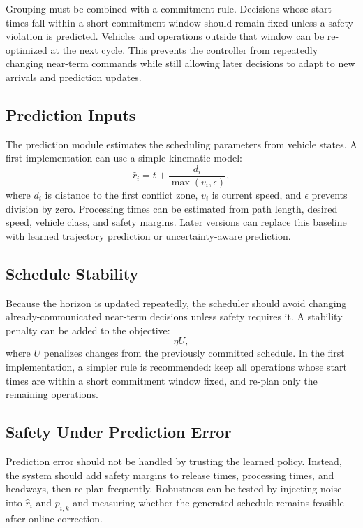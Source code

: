 Grouping must be combined with a commitment rule. Decisions whose start times fall within a short commitment window should remain fixed unless a safety violation is predicted. Vehicles and operations outside that window can be re-optimized at the next cycle. This prevents the controller from repeatedly changing near-term commands while still allowing later decisions to adapt to new arrivals and prediction updates.

\subsection{Prediction Inputs}

The prediction module estimates the scheduling parameters from vehicle states. A first implementation can use a simple kinematic model:
\begin{equation}
    \hat{r}_i = t + \frac{d_i}{\max(v_i,\epsilon)},
\end{equation}
where $d_i$ is distance to the first conflict zone, $v_i$ is current speed, and $\epsilon$ prevents division by zero. Processing times can be estimated from path length, desired speed, vehicle class, and safety margins. Later versions can replace this baseline with learned trajectory prediction or uncertainty-aware prediction.

\subsection{Schedule Stability}

Because the horizon is updated repeatedly, the scheduler should avoid changing already-communicated near-term decisions unless safety requires it. A stability penalty can be added to the objective:
\begin{equation}
    \eta U,
\end{equation}
where $U$ penalizes changes from the previously committed schedule. In the first implementation, a simpler rule is recommended: keep all operations whose start times are within a short commitment window fixed, and re-plan only the remaining operations.

\subsection{Safety Under Prediction Error}

Prediction error should not be handled by trusting the learned policy. Instead, the system should add safety margins to release times, processing times, and headways, then re-plan frequently. Robustness can be tested by injecting noise into $\hat{r}_i$ and $p_{i,k}$ and measuring whether the generated schedule remains feasible after online correction.


